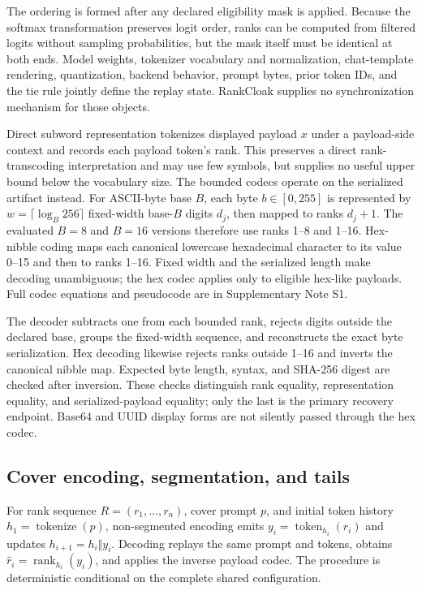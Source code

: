 \documentclass[fleqn,10pt]{wlscirep}
\newcommand{\Rank}{\operatorname{rank}}
\newcommand{\tok}{\operatorname{token}}
\begin{document}
The ordering is formed after any declared eligibility mask is applied. Because the softmax transformation preserves logit order, ranks can be computed from filtered logits without sampling probabilities, but the mask itself must be identical at both ends. Model weights, tokenizer vocabulary and normalization, chat-template rendering, quantization, backend behavior, prompt bytes, prior token IDs, and the tie rule jointly define the replay state. RankCloak supplies no synchronization mechanism for those objects.

Direct subword representation tokenizes displayed payload \(x\) under a payload-side context and records each payload token's rank. This preserves a direct rank-transcoding interpretation and may use few symbols, but supplies no useful upper bound below the vocabulary size. The bounded codecs operate on the serialized artifact instead. For ASCII-byte base \(B\), each byte \(b\in[0,255]\) is represented by \(w=\lceil\log_B 256\rceil\) fixed-width base-\(B\) digits \(d_j\), then mapped to ranks \(d_j+1\). The evaluated \(B=8\) and \(B=16\) versions therefore use ranks 1--8 and 1--16. Hex-nibble coding maps each canonical lowercase hexadecimal character to its value 0--15 and then to ranks 1--16. Fixed width and the serialized length make decoding unambiguous; the hex codec applies only to eligible hex-like payloads. Full codec equations and pseudocode are in Supplementary Note S1.

The decoder subtracts one from each bounded rank, rejects digits outside the declared base, groups the fixed-width sequence, and reconstructs the exact byte serialization. Hex decoding likewise rejects ranks outside 1--16 and inverts the canonical nibble map. Expected byte length, syntax, and SHA-256 digest are checked after inversion. These checks distinguish rank equality, representation equality, and serialized-payload equality; only the last is the primary recovery endpoint. Base64 and UUID display forms are not silently passed through the hex codec.

\subsection*{Cover encoding, segmentation, and tails}\label{sec:encoding-method}

For rank sequence \(R=(r_1,\ldots,r_n)\), cover prompt \(p\), and initial token history \(h_1=\operatorname{tokenize}(p)\), non-segmented encoding emits \(y_i=\tok_{h_i}(r_i)\) and updates \(h_{i+1}=h_i\Vert y_i\). Decoding replays the same prompt and tokens, obtains \(\hat r_i=\Rank_{h_i}(y_i)\), and applies the inverse payload codec. The procedure is deterministic conditional on the complete shared configuration.
\end{document}
